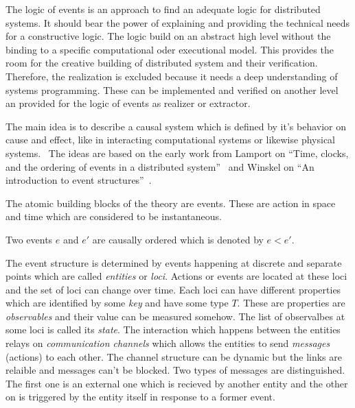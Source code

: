 The logic of events is an approach to find an adequate logic for distributed
systems. It should bear the power of explaining and providing the
technical needs for a constructive logic. The logic build on an
abstract high level without the binding to a specific computational
oder executional model. This provides the room for the creative building
of distributed system and their verification. Therefore, the realization
is excluded because it needs a deep understanding of systems programming.
These can be implemented and verified on another level an provided for
the logic of events as realizer or extractor.~\cite{bickford2005causal}

The main idea is to describe a causal system which is defined by it's
behavior on cause and effect, like in interacting computational systems
or likewise physical systems.~\cite{bickford2005causal}
The ideas are based on the early work from Lamport on ``Time, clocks, and
the ordering of events in a distributed system''~\cite{lamport1978time}
and Winskel on ``An introduction to event
structures''~\cite{winskel1988introduction}.

The atomic building blocks of the theory are events. These are action
in space and time which are considered to be instantaneous.

\begin{defi}
  Two events $e$ and $e'$ are causally ordered which is denoted by $e<e'$.
\end{defi}

The event structure is determined by events happening at discrete and separate
points which are called \textit{entities} or \textit{loci}. Actions or events
are located at these loci and the set of loci can change over time.
Each loci can have different properties which are identified by some
\textit{key} and have some type $T$. These are properties are
\textit{observables} and their value can be measured somehow.
The list of observalbes at some loci is called its \textit{state}.
The interaction which happens between the entities relays on
\textit{communication channels} which allows the entities to send
\textit{messages} (actions) to each other. The channel structure
can be dynamic but the links are relaible and messages can't be blocked.
Two types of messages are distinguished. The first one is an
external one which is recieved by another entity and the other on is triggered
by the entity itself in response to a former event.~\cite{bickford2005causal}


